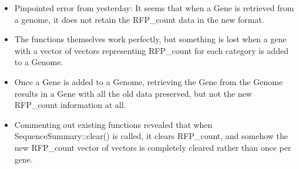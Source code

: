 \documentclass[12pt,hyperref]{labbook}
\begin{document}
\begin{itemize}
    \item Pinpointed error from yesterday: It seems that when a Gene is retrieved from a genome, it does not retain the RFP\_count data in the new format.
    \item The functions themselves work perfectly, but something is lost when a gene with a vector of vectors representing RFP\_count for each category is added to a Genome.
    \item Once a Gene is added to a Genome, retrieving the Gene from the Genome results in a Gene with all the old data preserved, but not the new RFP\_count information at all.
    \item Commenting out existing functions revealed that when SequenceSummary::clear() is called, it clears RFP\_count, and somehow the new RFP\_count vector of vectors is completely cleared rather than once per gene.
\end{itemize}

\end{document}
